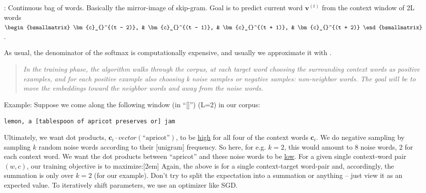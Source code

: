 \documentclass[11pt]{article}
\renewcommand\vec[2][]{\bm{#2}_{#1}}
\newcommand\p{\Needspace{10\baselineskip} \noindent}
\begin{document}
\begin{compactitem}
	
	\item {}: Continuous bag of words. Basically the mirror-image of skip-gram. Goal is to predict current word $\vec{v}^{(t)}$ from the context window of 2L words $\begin{bsmallmatrix} \vec{c}^{(t - 2)}, & \vec{c}^{(t - 1)}, & \vec{c}^{(t + 1)}, & \vec{c}^{(t + 2)} \end{bsmallmatrix}$.
\end{compactitem}
As usual, the denominator of the softmax is computationally expensive, and usually we approximate it with .
\vspace{-1em}
\begin{center}
	\begin{quote}
		{\footnotesize \textit{In the training phase, the
			algorithm walks through the corpus, at each target word choosing the surrounding
			context words as positive examples, and for each positive example also choosing k
			noise samples or negative samples: non-neighbor words. The goal will be to move
			the embeddings toward the neighbor words and away from the noise words.}}
	\end{quote}
\end{center}
\vspace{1em}

\p Example: Suppose we come along the following window (in ``[]'') (L=2) in our corpus:
\vspace{-1em}
\begin{center}
\texttt{lemon, a [tablespoon of apricot preserves or] jam}
\end{center}
Ultimately, we want dot products, $\vec[i]{c} \cdot vector(\text{``apricot''})$, to be \underline{high} for all four of the context words $\vec[i]{c}$. We do negative sampling by sampling $k$ random noise words according to their [unigram] frequency. So here, for e.g. $k = 2$, this would amount to 8 noise words, 2 for each context word. We want the dot products between ``apricot'' and these noise words to be \underline{low}. For a given single context-word pair $(w, c)$, our training objective is to maximize:[2em]
Again, the above is for a single context-target word-pair and, accordingly, the summation is only over $k = 2$ (for our example). Don't try to split the expectation into a summation or anything -- just view it as an expected value. To iteratively shift parameters, we use an optimizer like SGD.\\
\end{document}
